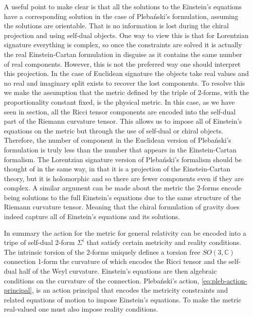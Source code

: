 \documentclass[10pt]{report}
\newcommand{\pleb}[0]{Pleba\'nski}
\theoremstyle{definition}
\newcommand{\C}[0]{\mathbb{C}}
\begin{document}
A useful point to make clear is that all the solutions to the Einstein's equations have a corresponding solution in the case of \pleb{}'s formulation, assuming the solutions are orientable. That is no information is lost during the chiral projection and using self-dual objects. One way to view this is that for Lorentzian signature everything is complex, so once the constraints are solved it is actually the real Einstein-Cartan formulation in disguise as it contains the same number of real components. However, this is not the preferred way one should interpret this projection. In the case of Euclidean signature the objects take real values and no real and imaginary split exists to recover the lost components. To resolve this we make the assumption that the metric defined by the triple of 2-forms, with the proportionality constant fixed, is the physical metric. In this case, as we have seen in section, all the Ricci tensor components are encoded into the self-dual part of the Riemann curvature tensor. This allows us to impose all of Einstein's equations on the metric but through the use of self-dual or chiral objects.  Therefore, the number of component in the Euclidean version of \pleb{}'s formulation is truly less than the number that appears in the Einstein-Cartan formalism. The Lorentzian signature version of \pleb{}'s formalism should be thought of in the same way, in that it is a projection of the Einstein-Cartan theory, but it is holomorphic and so there are fewer components even if they are complex. A similar argument can be made about the metric the 2-forms encode being solutions to the full Einstein's equations due to the same structure of the Riemann curvature tensor. Meaning that the chiral formulation of gravity does indeed capture all of Einstein's equations and its solutions.

In summary the action for the metric for general relativity can be encoded into a tripe of self-dual 2-form $\Sigma^i$ that satisfy certain metricity and reality conditions. The intrinsic torsion of the 2-forms uniquely defines a torsion free $SO(3,\C)$ connection 1-form the curvature of which encodes the Ricci tensor and the self-dual half of the Weyl curvature. Einstein's equations are then algebraic conditions on the curvature of the connection. \pleb{}'s action, \cref{eq:pleb-action-principal}, is an action principal that encodes the metricity constraints and related equations of motion to impose Einstein's equations. To make the metric real-valued one must also impose reality conditions.
\end{document}
